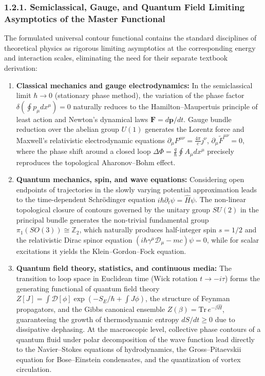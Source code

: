 \documentclass[11pt,a4paper]{article}
\theoremstyle{definition}
\begin{document}
\subsubsection{1.2.1. Semiclassical, Gauge, and Quantum Field Limiting Asymptotics of the Master Functional}\label{sec:1.2.1}

The formulated universal contour functional contains the standard disciplines of theoretical physics as rigorous limiting asymptotics at the corresponding energy and interaction scales, eliminating the need for their separate textbook derivation:

\begin{enumerate}
\item \textbf{Classical mechanics and gauge electrodynamics:} In the semiclassical limit $\hbar \to 0$ (stationary phase method), the variation of the phase factor $\delta \left( \oint p_\mu dx^\mu \right) = 0$ naturally reduces to the Hamilton--Maupertuis principle of least action and Newton's dynamical laws $\mathbf{F} = d\mathbf{p}/dt$. Gauge bundle reduction over the abelian group $U(1)$ generates the Lorentz force and Maxwell's relativistic electrodynamic equations $\partial_\mu F^{\mu\nu} = \frac{4\pi}{c} j^\nu$, $\partial_\mu \tilde{F}^{\mu\nu} = 0$, where the phase shift around a closed loop $\Delta\Phi = \frac{q}{\hbar}\oint A_\mu dx^\mu$ precisely reproduces the topological Aharonov--Bohm effect.

\item \textbf{Quantum mechanics, spin, and wave equations:} Considering open endpoints of trajectories in the slowly varying potential approximation leads to the time-dependent Schr\"odinger equation $i\hbar \partial_t \psi = \hat{H}\psi$. The non-linear topological closure of contours governed by the unitary group $SU(2)$ in the principal bundle generates the non-trivial fundamental group $\pi_1(SO(3)) \cong \mathbb{Z}_2$, which naturally produces half-integer spin $s = 1/2$ and the relativistic Dirac spinor equation $(i\hbar \gamma^\mu \mathcal{D}_\mu - mc)\psi = 0$, while for scalar excitations it yields the Klein--Gordon--Fock equation.

\item \textbf{Quantum field theory, statistics, and continuous media:} The transition to loop space in Euclidean time (Wick rotation $t \to -i\tau$) forms the generating functional of quantum field theory $Z[J] = \int \mathcal{D}[\phi]\exp(-S_E/\hbar + \int J\phi)$, the structure of Feynman propagators, and the Gibbs canonical ensemble $Z(\beta) = \text{Tr}\,e^{-\beta \hat{H}}$, guaranteeing the growth of thermodynamic entropy $dS/dt \ge 0$ due to dissipative dephasing. At the macroscopic level, collective phase contours of a quantum fluid under polar decomposition of the wave function lead directly to the Navier--Stokes equations of hydrodynamics, the Gross--Pitaevskii equation for Bose--Einstein condensates, and the quantization of vortex circulation.
\end{enumerate}
\end{document}
